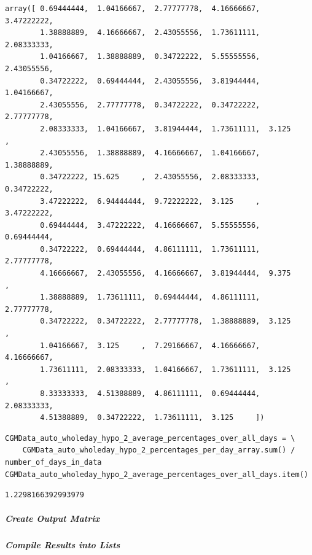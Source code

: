 \begin{verbatim}
array([ 0.69444444,  1.04166667,  2.77777778,  4.16666667,  3.47222222,
        1.38888889,  4.16666667,  2.43055556,  1.73611111,  2.08333333,
        1.04166667,  1.38888889,  0.34722222,  5.55555556,  2.43055556,
        0.34722222,  0.69444444,  2.43055556,  3.81944444,  1.04166667,
        2.43055556,  2.77777778,  0.34722222,  0.34722222,  2.77777778,
        2.08333333,  1.04166667,  3.81944444,  1.73611111,  3.125     ,
        2.43055556,  1.38888889,  4.16666667,  1.04166667,  1.38888889,
        0.34722222, 15.625     ,  2.43055556,  2.08333333,  0.34722222,
        3.47222222,  6.94444444,  9.72222222,  3.125     ,  3.47222222,
        0.69444444,  3.47222222,  4.16666667,  5.55555556,  0.69444444,
        0.34722222,  0.69444444,  4.86111111,  1.73611111,  2.77777778,
        4.16666667,  2.43055556,  4.16666667,  3.81944444,  9.375     ,
        1.38888889,  1.73611111,  0.69444444,  4.86111111,  2.77777778,
        0.34722222,  0.34722222,  2.77777778,  1.38888889,  3.125     ,
        1.04166667,  3.125     ,  7.29166667,  4.16666667,  4.16666667,
        1.73611111,  2.08333333,  1.04166667,  1.73611111,  3.125     ,
        8.33333333,  4.51388889,  4.86111111,  0.69444444,  2.08333333,
        4.51388889,  0.34722222,  1.73611111,  3.125     ])
\end{verbatim}

\begin{verbatim}
CGMData_auto_wholeday_hypo_2_average_percentages_over_all_days = \
    CGMData_auto_wholeday_hypo_2_percentages_per_day_array.sum() / number_of_days_in_data
CGMData_auto_wholeday_hypo_2_average_percentages_over_all_days.item()
\end{verbatim}

\begin{verbatim}
1.2298166392993979
\end{verbatim}

\subparagraph{Create Output Matrix}

\subparagraph{Compile Results into Lists}

